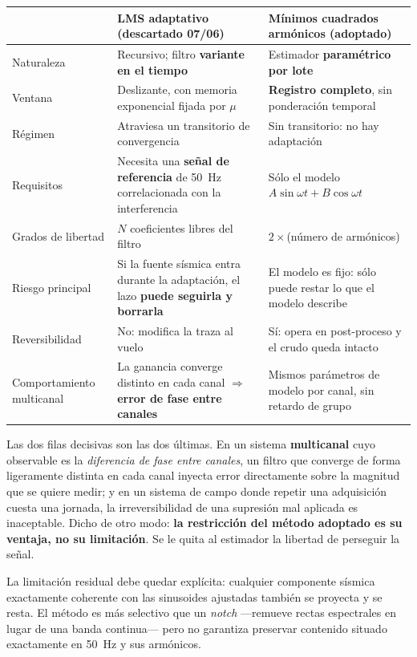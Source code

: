 \begin{center}\footnotesize
\begin{tabularx}{\textwidth}{@{}l X X@{}}
\toprule
& \textbf{LMS adaptativo} (descartado 07/06) & \textbf{M\'inimos cuadrados arm\'onicos} (adoptado) \\
\midrule
Naturaleza & Recursivo; filtro \textbf{variante en el tiempo} & Estimador \textbf{param\'etrico por lote} \\
Ventana & Deslizante, con memoria exponencial fijada por $\mu$ & \textbf{Registro completo}, sin ponderaci\'on temporal \\
R\'egimen & Atraviesa un transitorio de convergencia & Sin transitorio: no hay adaptaci\'on \\
Requisitos & Necesita una \textbf{se\~nal de referencia} de \SI{50}{\hertz} correlacionada con la interferencia & S\'olo el modelo $A\sin\omega t+B\cos\omega t$ \\
Grados de libertad & $N$ coeficientes libres del filtro & $2\times$(n\'umero de arm\'onicos) \\
Riesgo principal & Si la fuente s\'ismica entra durante la adaptaci\'on, el lazo \textbf{puede seguirla y borrarla} & El modelo es fijo: s\'olo puede restar lo que el modelo describe \\
Reversibilidad & No: modifica la traza al vuelo & S\'i: opera en post-proceso y el crudo queda intacto \\
Comportamiento multicanal & La ganancia converge distinto en cada canal $\Rightarrow$ \textbf{error de fase entre canales} & Mismos par\'ametros de modelo por canal, sin retardo de grupo \\
\bottomrule
\end{tabularx}
\end{center}

Las dos filas decisivas son las dos \'ultimas. En un sistema \textbf{multicanal} cuyo
observable es la \emph{diferencia de fase entre canales}, un filtro que converge de forma
ligeramente distinta en cada canal inyecta error directamente sobre la magnitud que se
quiere medir; y en un sistema de campo donde repetir una adquisici\'on cuesta una jornada,
la irreversibilidad de una supresi\'on mal aplicada es inaceptable. Dicho de otro modo:
\textbf{la restricci\'on del m\'etodo adoptado es su ventaja, no su limitaci\'on}. Se le
quita al estimador la libertad de perseguir la se\~nal.

La limitaci\'on residual debe quedar expl\'icita: cualquier componente s\'ismica
exactamente coherente con las sinusoides ajustadas tambi\'en se proyecta y se resta. El
m\'etodo es m\'as selectivo que un \emph{notch} ---remueve rectas espectrales en lugar de
una banda continua--- pero no garantiza preservar contenido situado exactamente en
\SI{50}{\hertz} y sus arm\'onicos.

